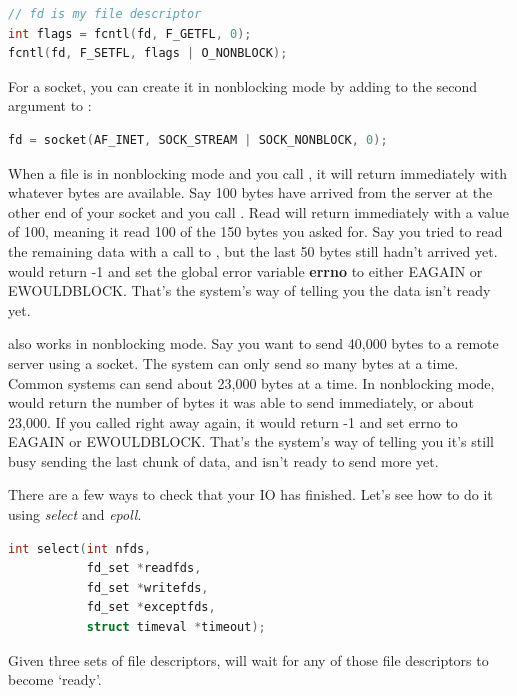 \begin{lstlisting}[language=C]
// fd is my file descriptor
int flags = fcntl(fd, F_GETFL, 0);
fcntl(fd, F_SETFL, flags | O_NONBLOCK);
\end{lstlisting}

For a socket, you can create it in nonblocking mode by adding  to the second argument to :

\begin{lstlisting}[language=C]
fd = socket(AF_INET, SOCK_STREAM | SOCK_NONBLOCK, 0);
\end{lstlisting}

When a file is in nonblocking mode and you call , it will return immediately with whatever bytes are available.
Say 100 bytes have arrived from the server at the other end of your socket and you call .
Read will return immediately with a value of 100, meaning it read 100 of the 150 bytes you asked for.
Say you tried to read the remaining data with a call to , but the last 50 bytes still hadn't arrived yet.
 would return -1 and set the global error variable \textbf{errno} to either EAGAIN or EWOULDBLOCK.
That's the system's way of telling you the data isn't ready yet.

 also works in nonblocking mode.
Say you want to send 40,000 bytes to a remote server using a socket.
The system can only send so many bytes at a time.
Common systems can send about 23,000 bytes at a time.
In nonblocking mode,  would return the number of bytes it was able to send immediately, or about 23,000.
If you called  right away again, it would return -1 and set errno to EAGAIN or EWOULDBLOCK.
That's the system's way of telling you it's still busy sending the last chunk of data, and isn't ready to send more yet.

There are a few ways to check that your IO has finished.
Let's see how to do it using \emph{select} and \emph{epoll}.

\begin{lstlisting}[language=C]
int select(int nfds, 
           fd_set *readfds, 
           fd_set *writefds,
           fd_set *exceptfds, 
           struct timeval *timeout);
\end{lstlisting}

Given three sets of file descriptors,  will wait for any of those file descriptors to become `ready'.


